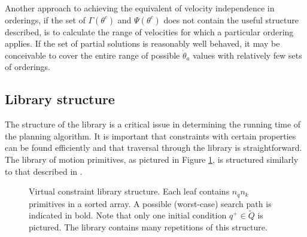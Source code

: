 Another approach to achieving the equivalent of velocity independence in orderings, if the set of $\Gamma(\theta^c)$ and $\Psi(\theta^c)$ does not contain the useful structure described, is to calculate the range of velocities for which a particular ordering applies. If the set of partial solutions is reasonably well behaved, it may be conceivable to cover the entire range of possible $\dot{\theta}_a$ values with relatively few sets of orderings.

\subsection{Library structure}
The structure of the library is a critical issue in determining the running time of the planning algorithm. It is important that constraints with certain properties can be found efficiently and that traversal through the library is straightforward. The library of motion primitives, as pictured in Figure \ref{fig:lib}, is structured similarly to that described in \cite{manchester13planning}.

\begin{figure}
	\centering
	\caption[Virtual constraint library structure]{Virtual constraint library structure. Each leaf contains $n_qn_k$ primitives in a sorted array. A possible (worst-case) search path is indicated in bold. Note that only  one initial condition $q^+\in\tilde{Q}$ is pictured. The library contains many repetitions of this structure.}
	\label{fig:lib}
\end{figure}


